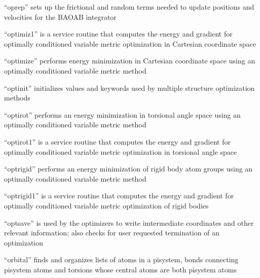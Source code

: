 \documentclass[letterpaper,11pt,english]{sphinxmanual}
\begin{document}
“oprep” sets up the frictional and random terms needed to
update positions and velocities for the BAOAB integrator



“optimiz1” is a service routine that computes the energy and
gradient for optimally conditioned variable metric optimization
in Cartesian coordinate space


“optimize” performs energy minimization in Cartesian coordinate
space using an optimally conditioned variable metric method


“optinit” initializes values and keywords used by multiple
structure optimization methods


“optirot” performs an energy minimization in torsional angle
space using an optimally conditioned variable metric method


“optirot1” is a service routine that computes the energy and
gradient for optimally conditioned variable metric optimization
in torsional angle space


“optrigid” performs an energy minimization of rigid body atom
groups using an optimally conditioned variable metric method


“optrigid1” is a service routine that computes the energy
and gradient for optimally conditioned variable metric
optimization of rigid bodies


“optsave” is used by the optimizers to write imtermediate
coordinates and other relevant information; also checks for
user requested termination of an optimization


“orbital” finds and organizes lists of atoms in a pisystem,
bonds connecting pisystem atoms and torsions whose central
atoms are both pisystem atoms

\end{document}

